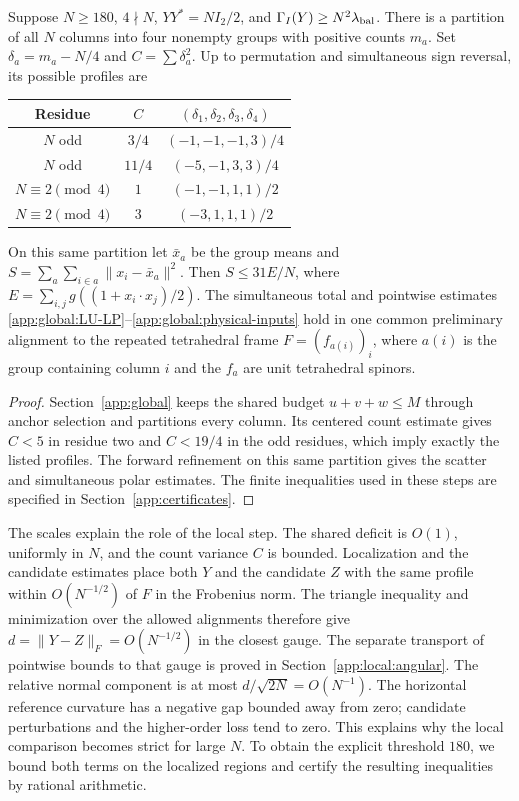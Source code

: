 \begin{proposition}\label{prop:localization}
Suppose $N\ge180$, $4\nmid N$, $YY^*=NI_2/2$, and
$\Gamma_I(Y)\ge N^2\lambda_{\rm bal}$. There is a partition of all
$N$ columns into four nonempty groups with positive counts $m_a$.
Set $\delta_a=m_a-N/4$ and $C=\sum\delta_a^2$. Up to permutation and
simultaneous sign reversal, its possible profiles are
\begin{center}
\begin{tabular}{ccc}
\toprule
Residue & $C$ & $(\delta_1,\delta_2,\delta_3,\delta_4)$\\
\midrule
$N$ odd & $3/4$ & $(-1,-1,-1,3)/4$\\
$N$ odd & $11/4$ & $(-5,-1,3,3)/4$\\
$N\equiv2\pmod4$ & $1$ & $(-1,-1,1,1)/2$\\
$N\equiv2\pmod4$ & $3$ & $(-3,1,1,1)/2$\\
\bottomrule
\end{tabular}
\end{center}
On this same partition let $\bar x_a$ be the group means and
$S=\sum_a\sum_{i\in a}\|x_i-\bar x_a\|^2$.
Then $S\le31E/N$, where $E=\sum_{i,j}g((1+x_i\cdot x_j)/2)$.
The simultaneous total and pointwise estimates
\eqref{app:global:LU-LP}--\eqref{app:global:physical-inputs}
hold in one common preliminary alignment to the repeated tetrahedral
frame $F=(f_{a(i)})_i$, where $a(i)$ is the group containing column $i$
and the $f_a$ are unit tetrahedral spinors.
\end{proposition}
\begin{proof}
Section~\ref{app:global} keeps the shared budget $u+v+w\le M$
through anchor selection and partitions every column. Its centered count
estimate gives $C<5$ in residue two and $C<19/4$ in the odd residues,
which imply exactly the listed profiles. The forward refinement on
this same partition gives the scatter and simultaneous polar estimates.
The finite inequalities used in these steps are specified in
Section~\ref{app:certificates}.
\end{proof}

The scales explain the role of the local step. The shared deficit is
$O(1)$, uniformly in $N$, and the count variance $C$ is bounded.
Localization and the candidate estimates place both $Y$ and the
candidate $Z$ with the same profile within $O(N^{-1/2})$ of $F$ in the
Frobenius norm. The triangle inequality and minimization over the allowed
alignments therefore give $d=\|Y-Z\|_F=O(N^{-1/2})$ in the closest gauge.
The separate transport of pointwise bounds to that gauge is proved in
Section~\ref{app:local:angular}. The relative normal component is at most
$d/\sqrt{2N}=O(N^{-1})$. The horizontal reference
curvature has a negative gap bounded away from zero; candidate
perturbations and the higher-order loss tend to zero. This explains why
the local comparison becomes strict for large $N$. To obtain the
explicit threshold $180$, we bound both terms on the localized regions
and certify the resulting inequalities by rational arithmetic.

